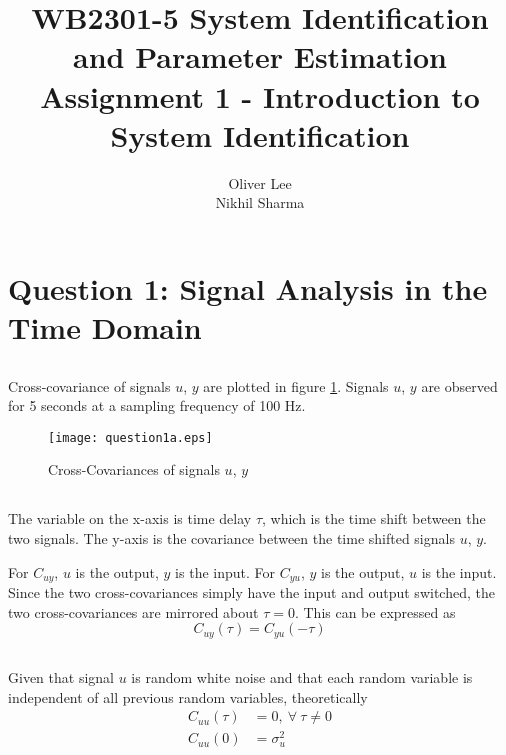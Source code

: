 \documentclass[times,12pt,reqno]{amsart}
\title{WB2301-5 System Identification and Parameter Estimation \\
Assignment 1 - Introduction to System Identification}
\author{Oliver Lee\\Nikhil Sharma}
\begin{document}
\maketitle

\section{Question 1: Signal Analysis in the Time Domain}

\subsection{}

Cross-covariance of signals $u$, $y$ are plotted in figure \ref{fig:q1a}. Signals
$u$, $y$ are observed for 5 seconds at a sampling frequency of 100 Hz.
\begin{figure}[H]
    \begin{center}
        \texttt{[image: question1a.eps]}
    \end{center}
    \caption{Cross-Covariances of signals $u$, $y$}
    \label{fig:q1a}
\end{figure}

\subsection{}
The variable on the x-axis is time delay $\tau$, which is the time shift
between the two signals. The y-axis is the covariance between the time shifted
signals $u$, $y$.

For $C_{uy}$, $u$ is the output, $y$ is the input. For $C_{yu}$, $y$ is the
output, $u$ is the input. Since the two cross-covariances simply have the input
and output switched, the two cross-covariances are mirrored about $\tau = 0$.
This can be expressed as
\begin{equation*}
    C_{uy}(\tau) = C_{yu}(-\tau)
\end{equation*}

\subsection{}
Given that signal $u$ is random white noise and that each random variable is
independent of all previous random variables, theoretically
\begin{align*}
    C_{uu}(\tau) &= 0, \: \forall \: \tau \neq 0 \\
    C_{uu}(0) &= \sigma_u^2
\end{align*}
\end{document}
